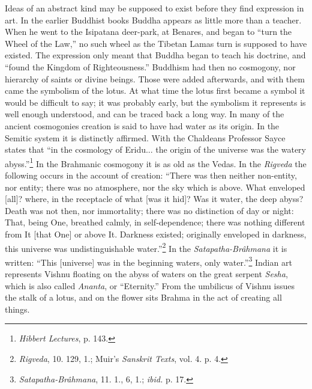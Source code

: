 \documentclass[a4paper, 11pt, oneside, polutonikogreek, english]{article}
\begin{document}
Ideas of an abstract kind may be supposed to exist before they find expression in art. In the earlier Buddhist books Buddha appears as little more than a teacher. When he went to the Isipatana deer-park, at Benares, and began to ``turn the Wheel of the Law,'' no such wheel as the Tibetan Lamas turn is supposed to have existed. The expression only meant that Buddha began to teach his doctrine, and ``found the Kingdom of Righteousness.'' Buddhism had then no cosmogony, nor hierarchy of saints or divine beings. Those were added afterwards, and with them came the symbolism of the lotus. At what time the lotus first became a symbol it would be difficult to say; it was probably early, but the symbolism it represents is well enough understood, and can be traced back a long way. In many of the ancient cosmogonies creation is said to have had water as its origin. In the Semitic system it is distinctly affirmed. With the Chaldeans Professor Sayce states that ``in the cosmology of Eridu... the origin of the universe was the watery abyss.''\footnote{\emph{Hibbert Lectures}, p. 143.} In the Brahmanic cosmogony it is as old as the Vedas. In the \emph{Rigveda} the following occurs in the account of creation: ``There was then neither non-entity, nor entity; there was no atmosphere, nor the sky which is above. What enveloped [all]? where, in the receptacle of what [was it hid]? Was it water, the deep abyss? Death was not then, nor immortality; there was no distinction of day or night: That, being One, breathed calmly, in self-dependence; there was nothing different from It [that One] or above It. Darkness existed; originally enveloped in darkness, this universe was undistinguishable water.''\footnote{\emph{Rigveda}, 10. 129, 1.; Muir's \emph{Sanskrit Texts}, vol. 4. p. 4.} In the \emph{Satapatha-Brâhmana} it is written: ``This [universe] was in the beginning waters, only water.''\footnote{\emph{Satapatha-Brâhmana}, 11. 1., 6, 1.; \emph{ibid.} p. 17.} Indian art represents Vishnu floating on the abyss of waters on the great serpent \emph{Sesha}, which is also called \emph{Ananta}, or ``Eternity.'' From the umbilicus of Vishnu issues the stalk of a lotus, and on the flower sits Brahma in the act of creating all things.
\end{document}
